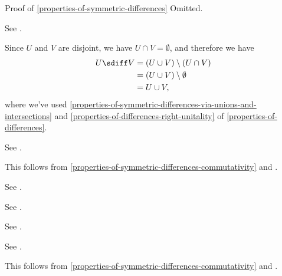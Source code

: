 \begin{Proof}{Proof of \cref{properties-of-symmetric-differences}}%
    Omitted.

    See \cite{proof-wiki:equivalence-of-definitions-of-symmetric-difference}.

    Since $U$ and $V$ are disjoint, we have $U\cap V=\emptyset$, and therefore we have
    \begin{align*}
        U\sdiff V &= (U\cup V)\setminus(U\cap V)\\
                  &= (U\cup V)\setminus\emptyset\\
                  &= U\cup V,
    \end{align*}
    where we've used \cref{properties-of-symmetric-differences-via-unions-and-intersections} and \cref{properties-of-differences-right-unitality} of \cref{properties-of-differences}.

    See \cite{proof-wiki:symmetric-difference-is-associative}.

    This follows from \cref{properties-of-symmetric-differences-commutativity} and \cite{proof-wiki:symmetric-difference-with-empty-set}.

    See \cite{proof-wiki:symmetric-difference-is-commutative}.

    See \cite{proof-wiki:symmetric-difference-with-self-is-empty-set}.

    See \cite{proof-wiki:union-of-symmetric-differences}.

    See \cite{proof-wiki:symmetric-difference-with-complement}.

    This follows from \cref{properties-of-symmetric-differences-commutativity} and \cite{proof-wiki:symmetric-difference-with-universe}.


\end{Proof}
